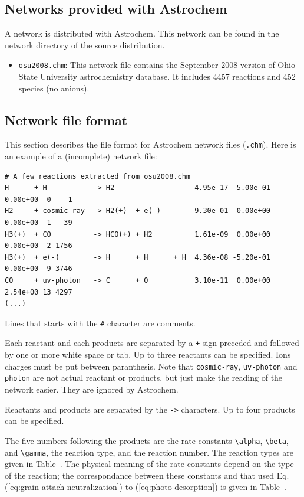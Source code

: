 \documentclass[a4paper,12pt]{article}
\begin{document}
{\subsection{Networks provided with Astrochem}
\label{sec:netw-prov-with}

A network is distributed with Astrochem. This network can be found in
the network directory of the source distribution.

\begin{itemize}

\item \verb=osu2008.chm=: This network file contains the September
  2008 version of Ohio State University astrochemistry database.  It
  includes 4457 reactions and 452 species (no anions).

\end{itemize}

\subsection{Network file format}

This section describes the file format for Astrochem network files
(\verb=.chm=). Here is an example of a (incomplete) network file:

\begin{verbatim}
# A few reactions extracted from osu2008.chm
H      + H           -> H2                   4.95e-17  5.00e-01  0.00e+00  0    1
H2     + cosmic-ray  -> H2(+)  + e(-)        9.30e-01  0.00e+00  0.00e+00  1   39
H3(+)  + CO          -> HCO(+) + H2          1.61e-09  0.00e+00  0.00e+00  2 1756
H3(+)  + e(-)        -> H      + H      + H  4.36e-08 -5.20e-01  0.00e+00  9 3746
CO     + uv-photon   -> C      + O           3.10e-11  0.00e+00  2.54e+00 13 4297
(...)
\end{verbatim}

Lines that starts with the \verb=#= character are comments.

Each reactant and each products are separated by a \verb=+= sign
preceded and followed by one or more white space or tab. Up to three
reactants can be specified. Ions charges must be put between
paranthesis. Note that \verb=cosmic-ray=, \verb=uv-photon= and
\verb=photon= are not actual reactant or products, but just make the
reading of the network easier. They are ignored by Astrochem.

Reactants and products are separated by the \verb=->= characters. Up
to four products can be specified.

The five numbers following the products are the rate constants
\verb=\alpha=, \verb=\beta=, and \verb=\gamma=, the reaction type, and
the reaction number. The reaction types are given in
Table~\label{tab:react-type-numb}. The physical meaning of the rate
constants depend on the type of the reaction; the correspondance
between these constants and that used
Eq. (\ref{eq:grain-attach-neutralization}) to
(\ref{eq:photo-desorption}) is given in
Table~\label{tab:rate-const-meaning}.

}
\end{document}
